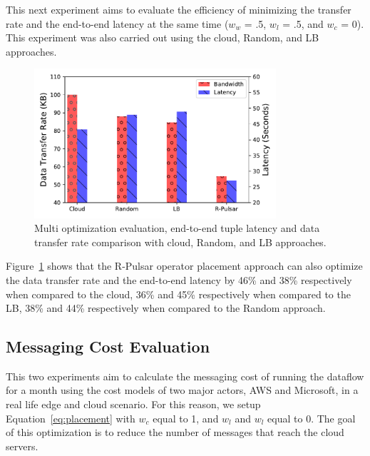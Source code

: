 This next experiment aims to evaluate the efficiency of minimizing the transfer rate and the end-to-end latency at the same time ($w_w$ = .5, $w_l$ = .5, and $w_c$ = 0). This experiment was also carried out using the cloud, Random, and LB approaches.

\begin{figure}
  \centering
  \includegraphics[width=0.8\textwidth]{Results/LandB.pdf}
  \caption{Multi optimization evaluation, end-to-end tuple latency and data transfer rate comparison with cloud, Random, and LB approaches.}
  \label{fig:both}
\end{figure} 

Figure~\ref{fig:both} shows that the R-Pulsar operator placement approach can also optimize the data transfer rate and the end-to-end latency by 46\% and 38\% respectively when compared to the cloud, 36\% and 45\% respectively when compared to the LB, 38\% and 44\% respectively when compared to the Random approach.

\subsection{Messaging Cost Evaluation}

This two experiments aim to calculate the messaging cost of running the dataflow for a month using the cost models of two major actors, AWS and Microsoft, in a real life edge and cloud scenario. For this reason, we setup Equation~\ref{eq:placement} with $w_c$ equal to 1, and $w_l$ and $w_l$ equal to 0. The goal of this optimization is to reduce the number of messages that reach the cloud servers.

